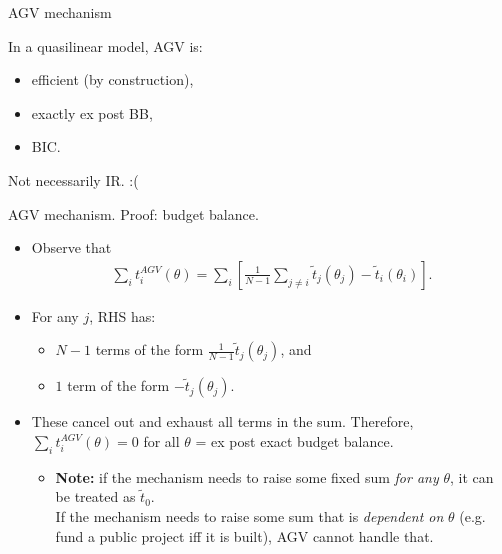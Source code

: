 \documentclass[english,10pt
,aspectratio=169
]{beamer}
\begin{document}
\begin{frame}{AGV mechanism}
\begin{theorem}[AGV]
	In a \alert{quasilinear} model, AGV is:
	\begin{itemize}
		\item efficient (by construction),
		\item exactly ex post BB,
		\item BIC.
	\end{itemize}
\end{theorem}
Not necessarily IR. :(
\end{frame}


\begin{frame}{AGV mechanism. Proof: budget balance.}
\begin{itemize}
	\item Observe that
	\vspace{-0.5em}\begin{align*}
		\sum_i t_i^{AGV} (\theta) = \sum_i \left[ \frac{1}{N-1} \sum_{j \neq i} \tilde{t}_j (\theta_j) - \tilde{t}_i (\theta_i) \right].
	\end{align*}
	\item For any $j$, RHS has:
	\begin{itemize}
		\item $N-1$ terms of the form $\frac{1}{N-1} \tilde{t}_j (\theta_j)$, and
		\item $1$ term of the form $-\tilde{t}_j(\theta_j)$.
	\end{itemize}
	\item These cancel out and exhaust all terms in the sum. Therefore, $\sum_i t_i^{AGV} (\theta) = 0$ for all $\theta$ = ex post exact budget balance.
	\begin{itemize}
		\item \textbf{Note:} if the mechanism needs to raise some fixed sum \emph{for any} $\theta$, it can be treated as $\tilde{t}_0$. \\
		If the mechanism needs to raise some sum that is \emph{dependent on} $\theta$ (e.g. fund a public project iff it is built), AGV \alert{cannot} handle that.
	\end{itemize}
\end{itemize}
\end{frame}
\end{document}
